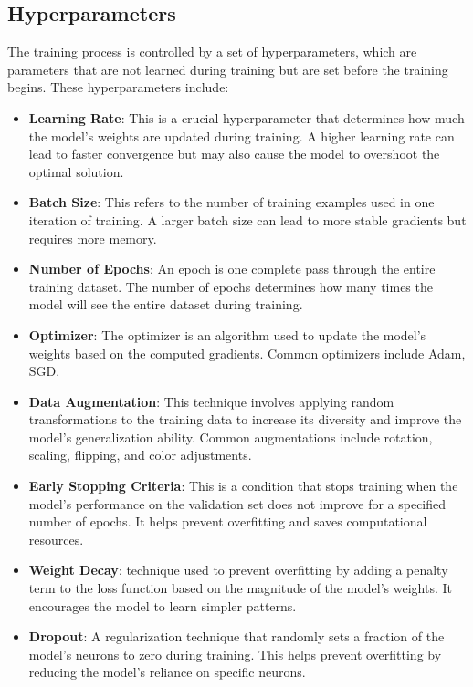 \subsection{Hyperparameters}
The training process is controlled by a set of hyperparameters, which are parameters that are not learned during training but are set before the training begins. These hyperparameters include:
\begin{itemize}
    \item \textbf{Learning Rate}: This is a crucial hyperparameter that determines how much the model's weights are updated during training. A higher learning rate can lead to faster convergence but may also cause the model to overshoot the optimal solution.
    \item \textbf{Batch Size}: This refers to the number of training examples used in one iteration of training. A larger batch size can lead to more stable gradients but requires more memory.
    \item \textbf{Number of Epochs}: An epoch is one complete pass through the entire training dataset. The number of epochs determines how many times the model will see the entire dataset during training.
    \item \textbf{Optimizer}: The optimizer is an algorithm used to update the model's weights based on the computed gradients. Common optimizers include Adam, SGD.
    \item \textbf{Data Augmentation}: This technique involves applying random transformations to the training data to increase its diversity and improve the model's generalization ability. Common augmentations include rotation, scaling, flipping, and color adjustments.
    \item \textbf{Early Stopping Criteria}: This is a condition that stops training when the model's performance on the validation set does not improve for a specified number of epochs. It helps prevent overfitting and saves computational resources.
    \item \textbf{Weight Decay}: technique used to prevent overfitting by adding a penalty term to the loss function based on the magnitude of the model's weights. It encourages the model to learn simpler patterns.
    \item \textbf{Dropout}: A regularization technique that randomly sets a fraction of the model's neurons to zero during training. This helps prevent overfitting by reducing the model's reliance on specific neurons.
\end{itemize}

